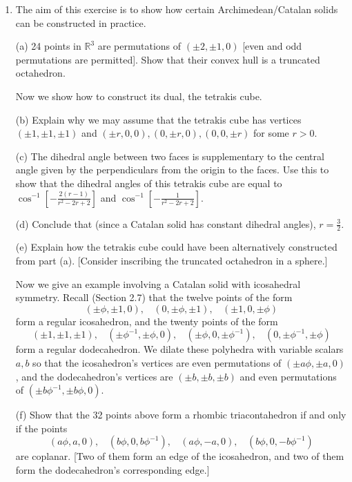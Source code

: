 \documentclass[leqno]{book}
\begin{document}
\begin{enumerate}
Here is the special case of each with $n=7$.
\begin{center}
\texttt{[image: Bipyramid.png]}~~~~~
\texttt{[image: Deltohedron.png]}\\
~~~Bipyramid~~~~~~Deltohedron
\end{center}
(c) If $n=4$, the bipyramid is an octahedron; and if $n=3$, the deltohedron is a cube.

\item The aim of this exercise is to show how certain Archimedean/Catalan solids can be constructed in practice.

(a) 24 points in $\mathbb R^3$ are permutations of $(\pm 2,\pm 1,0)$ [even and odd permutations are permitted].  Show that their convex hull is a truncated octahedron.

Now we show how to construct its dual, the tetrakis cube.

(b) Explain why we may assume that the tetrakis cube has vertices $(\pm 1,\pm 1,\pm 1)$ and $(\pm r,0,0),(0,\pm r,0),(0,0,\pm r)$ for some $r>0$.

(c) The dihedral angle between two faces is supplementary to the central angle given by the perpendiculars from the origin to the faces.  Use this to show that the dihedral angles of this tetrakis cube are equal to $\cos^{-1}\left[-\frac{2(r-1)}{r^2-2r+2}\right]$ and $\cos^{-1}\left[-\frac 1{r^2-2r+2}\right]$.

(d) Conclude that (since a Catalan solid has constant dihedral angles), $r=\frac 32$.

(e) Explain how the tetrakis cube could have been alternatively constructed from part (a).  [Consider inscribing the truncated octahedron in a sphere.]

Now we give an example involving a Catalan solid with icosahedral symmetry.  Recall (Section 2.7) that the twelve points of the form
$$(\pm\phi,\pm 1,0),~~~~(0,\pm\phi,\pm 1),~~~~(\pm 1,0,\pm\phi)$$
form a regular icosahedron, and the twenty points of the form
$$(\pm 1,\pm 1,\pm 1),~~~~(\pm\phi^{-1},\pm\phi,0),~~~~(\pm\phi,0,\pm\phi^{-1}),~~~~(0,\pm\phi^{-1},\pm\phi)$$
form a regular dodecahedron.  We dilate these polyhedra with variable scalars $a,b$ so that the icosahedron's vertices are even permutations of $(\pm a\phi,\pm a,0)$, and the dodecahedron's vertices are $(\pm b,\pm b,\pm b)$ and even permutations of $(\pm b\phi^{-1},\pm b\phi,0)$.

(f) Show that the 32 points above form a rhombic triacontahedron if and only if the points
$$(a\phi,a,0),~~~~(b\phi,0,b\phi^{-1}),~~~~(a\phi,-a,0),~~~~(b\phi,0,-b\phi^{-1})$$
are coplanar.  [Two of them form an edge of the icosahedron, and two of them form the dodecahedron's corresponding edge.]


\end{enumerate}
\end{document}
